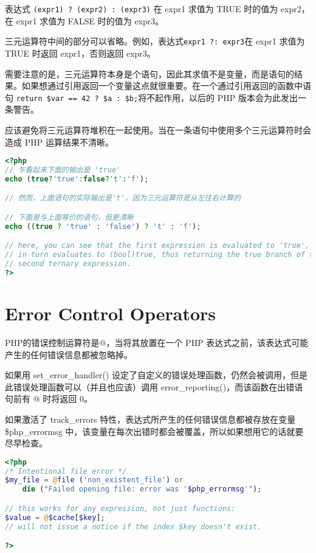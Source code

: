 表达式 \texttt{(expr1) ? (expr2) : (expr3)} 在 expr1 求值为 TRUE 时的值为 expr2，在 expr1 求值为 FALSE 时的值为 expr3。

三元运算符中间的部分可以省略。例如，表达式\texttt{expr1 ?: expr3}在 expr1 求值为 TRUE 时返回 expr1，否则返回 expr3。

需要注意的是，三元运算符本身是个语句，因此其求值不是变量，而是语句的结果。如果想通过引用返回一个变量这点就很重要。在一个通过引用返回的函数中语句 \texttt{return \$var == 42 ? \$a : \$b;}将不起作用，以后的 PHP 版本会为此发出一条警告。

应该避免将三元运算符堆积在一起使用。当在一条语句中使用多个三元运算符时会造成 PHP 运算结果不清晰。


\begin{lstlisting}[language=PHP]
<?php
// 乍看起来下面的输出是 'true'
echo (true?'true':false?'t':'f');

// 然而，上面语句的实际输出是't'，因为三元运算符是从左往右计算的

// 下面是与上面等价的语句，但更清晰
echo ((true ? 'true' : 'false') ? 't' : 'f');

// here, you can see that the first expression is evaluated to 'true', which
// in turn evaluates to (bool)true, thus returning the true branch of the
// second ternary expression.
?>
\end{lstlisting}


\section{Error Control Operators}

PHP的错误控制运算符是@，当将其放置在一个 PHP 表达式之前，该表达式可能产生的任何错误信息都被忽略掉。

如果用 set\_error\_handler() 设定了自定义的错误处理函数，仍然会被调用，但是此错误处理函数可以（并且也应该）调用 error\_reporting()，而该函数在出错语句前有 @ 时将返回 0。

如果激活了 track\_errors 特性，表达式所产生的任何错误信息都被存放在变量 \$php\_errormsg 中，该变量在每次出错时都会被覆盖，所以如果想用它的话就要尽早检查。

\begin{lstlisting}[language=PHP]
<?php
/* Intentional file error */
$my_file = @file ('non_existent_file') or
    die ("Failed opening file: error was '$php_errormsg'");

// this works for any expression, not just functions:
$value = @$cache[$key];
// will not issue a notice if the index $key doesn't exist.

?>
\end{lstlisting}

